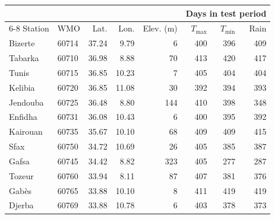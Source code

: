 \begin{tabular}{llrrrrrr}
\toprule
 & & & & & \multicolumn{3}{c}{Days in test period} \\
\cmidrule(lr){6-8}
Station & WMO & Lat. & Lon. & Elev. (m) & $T_{\max}$ & $T_{\min}$ & Rain \\
\midrule
Bizerte & 60714 & 37.24 & 9.79 & 6 & 400 & 396 & 409 \\
Tabarka & 60710 & 36.98 & 8.88 & 70 & 413 & 420 & 417 \\
Tunis & 60715 & 36.85 & 10.23 & 7 & 405 & 404 & 404 \\
Kelibia & 60720 & 36.85 & 11.08 & 30 & 392 & 394 & 393 \\
Jendouba & 60725 & 36.48 & 8.80 & 144 & 410 & 398 & 348 \\
Enfidha & 60731 & 36.08 & 10.43 & 6 & 400 & 395 & 392 \\
Kairouan & 60735 & 35.67 & 10.10 & 68 & 409 & 409 & 415 \\
Sfax & 60750 & 34.72 & 10.69 & 26 & 405 & 385 & 387 \\
Gafsa & 60745 & 34.42 & 8.82 & 323 & 405 & 277 & 287 \\
Tozeur & 60760 & 33.94 & 8.11 & 87 & 407 & 381 & 376 \\
Gab\`es & 60765 & 33.88 & 10.10 & 8 & 411 & 419 & 419 \\
Djerba & 60769 & 33.88 & 10.78 & 6 & 403 & 378 & 373 \\
\bottomrule
\end{tabular}